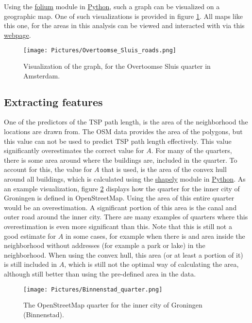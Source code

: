 Using the \url{folium} module in \url{Python}, such a graph can be visualized on a geographic map.
One of such visualizations is provided in figure \ref{fig:overtoomse_sluis}. All maps like this one,
for the areas in this analysis can be viewed and interacted with via this
\href{https://koenstevens.nl/projects/BSc_thesis/maps/}{\url{webpage}}.
\begin{figure}[H]
	\caption{Visualization of the graph, for the Overtoomse Sluis quarter in Amsterdam.}
	\label{fig:overtoomse_sluis}
	\texttt{[image: Pictures/Overtoomse\_Sluis\_roads.png]}
\end{figure}

\subsection{Extracting features}
One of the predictors of the TSP path length, is the area of the neighborhood
the locations are drawn from. The OSM data provides the area of the polygons,
but this value can not be used to predict TSP path length effectively.
This value significantly overestimates the correct value for $A$.
For many of the quarters, there is some area around where the buildings are, included in the quarter.
To account for this, the value for $A$ that is used, is the area of the convex
hull around all buildings, which is calculated using the \url{shapely}
module in \url{Python}. As an example visualization, figure \ref{fig:binnenstad_quarter} displays
how the quarter for the inner city of Groningen is defined in OpenStreetMap. Using the area of this
entire quarter would be an overestimation. A significant portion of this area is the canal and outer
road around the inner city. There are many examples of quarters where this overestimation is even
more significant than this. Note that this is still not a good estimate for $A$ in some cases,
for example when there is and area inside the neighborhood without addresses (for example a park or lake)
in the neighborhood. When using the convex hull, this area (or at least a portion of it) is still included
in $A$, which is still not the optimal way of calculating the area, although still better than using the
pre-defined area in the data.
\begin{figure}[H]
	\caption{The OpenStreetMap quarter for the inner city of Groningen (Binnenstad). \citep{openstreetmap}}
	\label{fig:binnenstad_quarter}
	\texttt{[image: Pictures/Binnenstad\_quarter.png]}
\end{figure}

